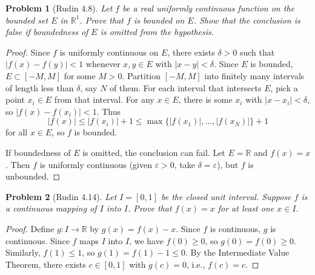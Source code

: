 \documentclass[12 pt]{article}        	%
\newtheorem{prob}{Problem}
\newcommand{\R}{\mathbb{R}}
\newcommand{\eps}{\varepsilon}
\begin{document}
\begin{prob}[Rudin 4.8]
Let $f$ be a real uniformly continuous function on the bounded set $E$ in $\R^1$. Prove that $f$ is bounded on $E$. Show that the conclusion is false if boundedness of $E$ is omitted from the hypothesis.
\end{prob}
\begin{proof}
Since $f$ is uniformly continuous on $E$, there exists $\delta > 0$ such that $|f(x) - f(y)| < 1$ whenever $x, y \in E$ with $|x - y| < \delta$. Since $E$ is bounded, $E \subset [-M, M]$ for some $M > 0$. Partition $[-M, M]$ into finitely many intervals of length less than $\delta$, say $N$ of them. For each interval that intersects $E$, pick a point $x_i \in E$ from that interval. For any $x \in E$, there is some $x_i$ with $|x - x_i| < \delta$, so $|f(x) - f(x_i)| < 1$. Thus
\[
|f(x)| \leq |f(x_i)| + 1 \leq \max\{|f(x_1)|, \dots, |f(x_N)|\} + 1
\]
for all $x \in E$, so $f$ is bounded.

If boundedness of $E$ is omitted, the conclusion can fail. Let $E = \R$ and $f(x) = x$. Then $f$ is uniformly continuous (given $\eps > 0$, take $\delta = \eps$), but $f$ is unbounded.
\end{proof}

\begin{prob}[Rudin 4.14]
Let $I = [0,1]$ be the closed unit interval. Suppose $f$ is a continuous mapping of $I$ into $I$. Prove that $f(x) = x$ for at least one $x \in I$.
\end{prob}
\begin{proof}
Define $g: I \to \R$ by $g(x) = f(x) - x$. Since $f$ is continuous, $g$ is continuous. Since $f$ maps $I$ into $I$, we have $f(0) \geq 0$, so $g(0) = f(0) \geq 0$. Similarly, $f(1) \leq 1$, so $g(1) = f(1) - 1 \leq 0$. By the Intermediate Value Theorem, there exists $c \in [0,1]$ with $g(c) = 0$, i.e., $f(c) = c$.
\end{proof}
\end{document}
